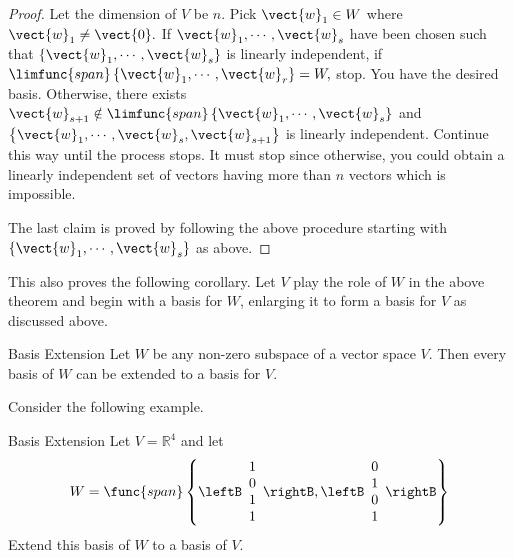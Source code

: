 \begin{proof}
Let the dimension of $V$ be $n$. Pick $\vect{w}_{1}\in W$
where $\vect{w}_{1}\neq \vect{0}.$ If $\vect{w}_{1},\cdots ,\vect{w}_{s}$ have
been chosen such that $\left\{ \vect{w}_{1},\cdots ,\vect{w}_{s}\right\} $ is
linearly independent, if $\limfunc{span}\left\{ \vect{w}_{1},\cdots ,\vect{w}
_{r}\right\} =W,$ stop. You have the desired basis. Otherwise, there exists $
\vect{w}_{s+1}\notin \limfunc{span}\left\{ \vect{w}_{1},\cdots ,\vect{w}
_{s}\right\} $ and $\left\{ \vect{w}_{1},\cdots ,
\vect{w}_{s},\vect{w}_{s+1}\right\} $ is linearly independent. Continue this
way until the process stops. It must stop since otherwise, you could obtain a
linearly independent set of vectors having more than $n$ vectors which is
impossible.

The last claim is proved by following the above procedure starting with $
\left\{ \vect{w}_{1},\cdots ,\vect{w}_{s}\right\} $ as above. 
\end{proof}

This also proves the following corollary. Let $V$ play the role of $
W$ in the above theorem and begin with a basis for $W$, enlarging it to form
a basis for $V$ as discussed above.

\begin{corollary}{Basis Extension}{}
Let $W$ be any non-zero subspace of a vector space $V$.
Then every basis of $W$ can be extended to a basis for $V$.
\end{corollary}

Consider the following example.

\begin{example}{Basis Extension}{}
Let $V=\mathbb{R}^{4}$ and let 
\begin{equation*}
W=\func{span}\left\{ \leftB 
\begin{array}{c}
1 \\ 
0 \\ 
1 \\ 
1
\end{array}
\rightB ,\leftB 
\begin{array}{c}
0 \\ 
1 \\ 
0 \\ 
1
\end{array}
\rightB \right\}
\end{equation*}
Extend this basis of $W$ to a basis of $V$.
\end{example}

